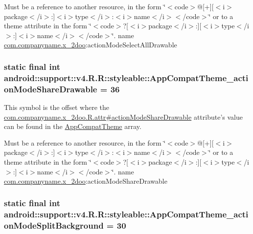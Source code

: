 Must be a reference to another resource, in the form \char`\"{}$<$code$>$@\mbox{[}+\mbox{]}\mbox{[}$<$i$>$package$<$/i$>$:\mbox{]}$<$i$>$type$<$/i$>$:$<$i$>$name$<$/i$>$$<$/code$>$\char`\"{} or to a theme attribute in the form \char`\"{}$<$code$>$?\mbox{[}$<$i$>$package$<$/i$>$:\mbox{]}\mbox{[}$<$i$>$type$<$/i$>$:\mbox{]}$<$i$>$name$<$/i$>$$<$/code$>$\char`\"{}.  name \hyperlink{namespacecom_1_1companyname_1_1x__2doo}{com.companyname.x\_\-2doo}:actionModeSelectAllDrawable \hypertarget{classandroid_1_1support_1_1v4_1_1_r_1_1styleable_5d3af33e63914f57419c77e882cafd0c}{
\subsubsection[{AppCompatTheme\_\-actionModeShareDrawable}]{\setlength{\rightskip}{0pt plus 5cm}static final int android::support::v4.R.R::styleable::AppCompatTheme\_\-actionModeShareDrawable = 36}}
\label{classandroid_1_1support_1_1v4_1_1_r_1_1styleable_5d3af33e63914f57419c77e882cafd0c}


This symbol is the offset where the \hyperlink{classcom_1_1companyname_1_1x__2doo_1_1_r_1_1attr_5cba5b5e90ccae3d08eaea7f5b1159ac}{com.companyname.x\_\-2doo.R.attr\#actionModeShareDrawable} attribute's value can be found in the \hyperlink{classandroid_1_1support_1_1v4_1_1_r_1_1styleable_0873e92ba21076bb5a4aeadeb7f5779f}{AppCompatTheme} array.

Must be a reference to another resource, in the form \char`\"{}$<$code$>$@\mbox{[}+\mbox{]}\mbox{[}$<$i$>$package$<$/i$>$:\mbox{]}$<$i$>$type$<$/i$>$:$<$i$>$name$<$/i$>$$<$/code$>$\char`\"{} or to a theme attribute in the form \char`\"{}$<$code$>$?\mbox{[}$<$i$>$package$<$/i$>$:\mbox{]}\mbox{[}$<$i$>$type$<$/i$>$:\mbox{]}$<$i$>$name$<$/i$>$$<$/code$>$\char`\"{}.  name \hyperlink{namespacecom_1_1companyname_1_1x__2doo}{com.companyname.x\_\-2doo}:actionModeShareDrawable \hypertarget{classandroid_1_1support_1_1v4_1_1_r_1_1styleable_5e9c280564e789966ff3d14b724504a1}{
\subsubsection[{AppCompatTheme\_\-actionModeSplitBackground}]{\setlength{\rightskip}{0pt plus 5cm}static final int android::support::v4.R.R::styleable::AppCompatTheme\_\-actionModeSplitBackground = 30}}
\label{classandroid_1_1support_1_1v4_1_1_r_1_1styleable_5e9c280564e789966ff3d14b724504a1}


